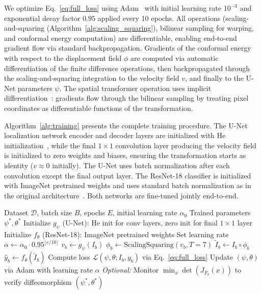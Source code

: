 \documentclass[10pt,journal,compsoc]{IEEEtran}
\begin{document}
We optimize Eq.~\eqref{eq:full_loss} using Adam~\cite{kingma2014adam} with initial learning rate $10^{-3}$ and exponential decay factor $0.95$ applied every 10 epochs. All operations (scaling-and-squaring (Algorithm~\ref{alg:scaling_squaring}), bilinear sampling for warping, and conformal energy computation) are differentiable, enabling end-to-end gradient flow via standard backpropagation. Gradients of the conformal energy with respect to the displacement field $\phi$ are computed via automatic differentiation of the finite difference operations, then backpropagated through the scaling-and-squaring integration to the velocity field $v$, and finally to the U-Net parameters $\psi$. The spatial transformer operation uses implicit differentiation~\cite{jaderberg2015spatial}: gradients flow through the bilinear sampling by treating pixel coordinates as differentiable functions of the transformation.

Algorithm~\ref{alg:training} presents the complete training procedure. The U-Net localization network encoder and decoder layers are initialized with He initialization~\cite{he2016identity}, while the final $1 \times 1$ convolution layer producing the velocity field is initialized to zero weights and biases, ensuring the transformation starts as identity ($v \approx 0$ initially). The U-Net uses batch normalization after each convolution except the final output layer. The ResNet-18 classifier is initialized with ImageNet pretrained weights and uses standard batch normalization as in the original architecture~\cite{he2016resnet}. Both networks are fine-tuned jointly end-to-end.

\begin{algorithm}[t]
\caption{DCA Training Procedure}
\label{alg:training}
\begin{algorithmic}[1]
\REQUIRE Dataset $\mathcal{D}$, batch size $B$, epochs $E$, initial learning rate $\alpha_0$
\ENSURE Trained parameters $\psi^*, \theta^*$
\STATE Initialize $g_\psi$ (U-Net): He init for conv layers, zero init for final $1 \times 1$ layer
\STATE Initialize $f_\theta$ (ResNet-18): ImageNet pretrained weights
    \STATE Set learning rate $\alpha \leftarrow \alpha_0 \cdot 0.95^{\lfloor e/10 \rfloor}$
        \STATE $v_b \leftarrow g_\psi(I_b)$ \quad {}
        \STATE $\phi_b \leftarrow \text{ScalingSquaring}(v_b, T=7)$ \quad {}
        \STATE $\tilde{I}_b \leftarrow I_b \circ \phi_b$ \quad {}
        \STATE $\hat{y}_b \leftarrow f_\theta(\tilde{I}_b)$ \quad {}
        \STATE Compute loss $\mathcal{L}(\psi, \theta; I_b, y_b)$ via Eq.~\eqref{eq:full_loss}
        \STATE Update $(\psi, \theta)$ via Adam with learning rate $\alpha$
        \STATE \textit{Optional:} Monitor $\min_x \det(J_{F_b}(x))$ to verify diffeomorphism
    \ENDFOR
\ENDFOR
\RETURN $(\psi^*, \theta^*)$
\end{algorithmic}
\end{algorithm}
\end{document}
